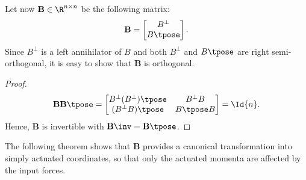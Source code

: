 Let now \(\mathbf{B} \in \R^{n\times n}\) be the following matrix:
\[
    \mathbf{B} = 
    \begin{bmatrix}
        B^\perp \\
        B\tpose \\
    \end{bmatrix}
    .
\]
Since \(B^\perp\) is a left annihilator of \(B\) and both \(B^\perp\) and
\(B\tpose\) are right semi-orthogonal, it is easy to show that \(\mathbf{B}\) is
orthogonal.
\begin{proof}
\[
    \mathbf{B}\mathbf{B}\tpose = 
    \begin{bmatrix}
        B^\perp (B^\perp)\tpose & B^\perp B \\
        (B^\perp B)\tpose & B\tpose B
    \end{bmatrix} = \Id{n}
    .
\]
Hence, \(\mathbf{B}\) is invertible with \(\mathbf{B}\inv = \mathbf{B}\tpose\).
\end{proof}

The following theorem shows that \(\mathbf{B}\) provides a canonical
transformation into simply actuated coordinates, so that only the actuated momenta
are affected by the input forces.

